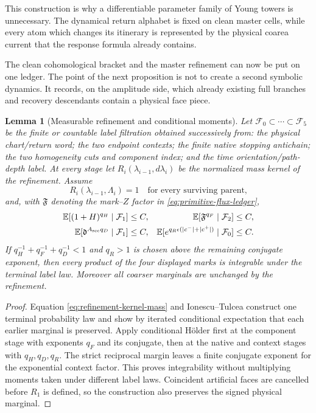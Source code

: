 \documentclass[11pt]{article}
\newtheorem{lemma}[theorem]{Lemma}
\begin{document}
This construction is why a differentiable parameter family of Young towers
is unnecessary.  The dynamical return alphabet is fixed on clean master
cells, while every atom which changes its itinerary is represented by the
physical coarea current that the response formula already contains.

The clean cohomological bracket and the master refinement can now be put on one ledger.  The
point of the next proposition is not to create a second symbolic dynamics.
It records, on the amplitude side, which already existing full branches and
recovery descendants contain a physical face piece.

\begin{lemma}[Measurable refinement and conditional moments]
\label{lem:measurable-refinement-moments}
Let $\mathcal F_0\subset\cdots\subset\mathcal F_5$ be the finite or countable
label filtration obtained successively from: the physical chart/return word;
the two endpoint contexts; the finite native stopping antichain; the two
homogeneity cuts and component index; and the time orientation/path-depth
label.  At every stage let $R_i(\lambda_{i-1},d\lambda_i)$ be the normalized
mass kernel of the refinement.  Assume
\begin{equation}
\label{eq:refinement-kernel-mass}
 R_i(\lambda_{i-1},\Lambda_i)=1
 \quad\text{for every surviving parent,}
\end{equation}
and, with $\mathfrak F$ denoting the mark--$Z$ factor in
\eqref{eq:primitive-flux-ledger},
\begin{align}
 \mathbb E[(1+H)^{q_H}\mid\mathcal F_1]&\le C,&
 \mathbb E[\mathfrak F^{q_F}\mid\mathcal F_2]&\le C,
 \label{eq:conditional-refinement-moments}\\
 \mathbb E[\mathfrak d^{A_{\rm sec}q_D}\mid\mathcal F_1]&\le C,&
 \mathbb E[e^{q_R\epsilon(|c^-|+|c^+|)}\mid\mathcal F_0]&\le C.
 \notag
\end{align}
If $q_H^{-1}+q_F^{-1}+q_D^{-1}<1$ and $q_R>1$ is chosen above the remaining
conjugate exponent, then every product of the four displayed marks is
integrable under the terminal label law.  Moreover all coarser marginals are
unchanged by the refinement.
\end{lemma}

\begin{proof}
Equation \eqref{eq:refinement-kernel-mass} and Ionescu--Tulcea construct one
terminal probability law and show by iterated conditional expectation that
each earlier marginal is preserved.  Apply conditional H\"older first at the
component stage with exponents $q_F$ and its conjugate, then at the native and
context stages with $q_H,q_D,q_R$.  The strict reciprocal margin leaves a
finite conjugate exponent for the exponential context factor.  This proves
integrability without multiplying moments taken under different label laws.
Coincident artificial faces are cancelled before $R_1$ is defined, so the
construction also preserves the signed physical marginal.
\end{proof}
\end{document}
